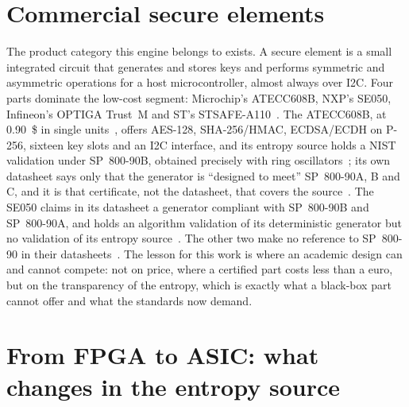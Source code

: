 \section{Commercial secure elements}
\label{sec:soa_se}

The product category this engine belongs to exists. A secure element is
a small integrated circuit that generates and stores keys and performs
symmetric and asymmetric operations for a host microcontroller, almost
always over I2C. Four parts dominate the low-cost segment: Microchip's
ATECC608B, NXP's SE050, Infineon's OPTIGA Trust~M and ST's STSAFE-A110~\cite{microchip_atecc608b_ds,
nxp_se050_ds, infineon_optiga_trustm_ds, st_stsafe_a110_ds}. The
ATECC608B, at 0.90~\$ in single units~\cite{digikey_prices_2026}, offers
AES-128, SHA-256/HMAC, ECDSA/ECDH on P-256, sixteen key slots and an I2C
interface, and its entropy source holds a NIST validation under
SP~800-90B, obtained precisely with ring oscillators~\cite{nist_esv_e46};
its own datasheet says only that the generator is ``designed to meet''
SP~800-90A, B and C, and it is that certificate, not the datasheet, that
covers the source~\cite{microchip_atecc608b_ds}. The SE050 claims in its
datasheet a generator compliant with SP~800-90B and SP~800-90A, and holds
an algorithm validation of its deterministic generator but no validation
of its entropy source~\cite{nxp_se050_ds, nist_cmvp_3840}. The other two make no reference
to SP~800-90 in their datasheets~\cite{infineon_optiga_trustm_ds,
st_stsafe_a110_ds}.
The lesson for this work is where an academic design can and cannot
compete: not on price, where a certified part costs less than a euro, but
on the transparency of the entropy, which is exactly what a black-box part
cannot offer and what the standards now demand.

\section{From FPGA to ASIC: what changes in the entropy source}
\label{sec:soa_asic}

